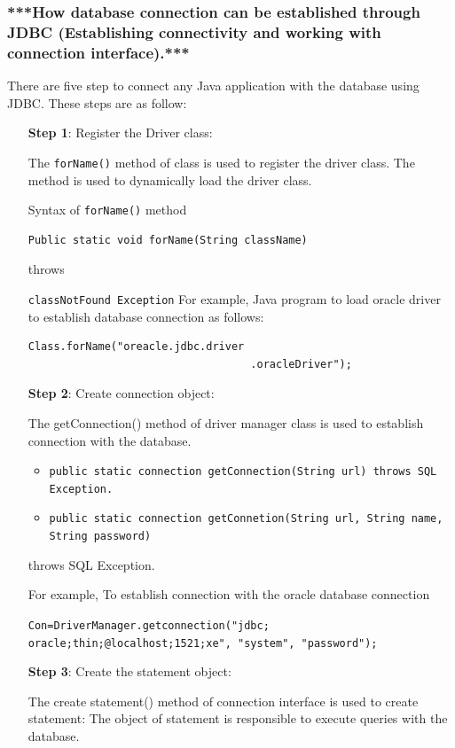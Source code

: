 \documentclass[twocolumn, a4paper]{article}
\begin{document}
\subsubsection{***How database connection can be established through JDBC
(Establishing connectivity and working with connection interface).***}
There are five step to connect any Java application with the database using
JDBC. These steps are as follow:
\begin{itemize}
  \item [\textbf{Step 1}:] Register the Driver class:

    The \verb+forName()+ method of class is used to register the driver class.
    The method is used to dynamically load the driver class.

    Syntax of \verb+forName()+ method
    \begin{lstlisting}
Public static void forName(String className)
    \end{lstlisting}
    throws

    \verb+classNotFound Exception+
    For example, Java program to load oracle driver to establish database
    connection as follows:

    \begin{lstlisting}
Class.forName("oreacle.jdbc.driver
                                   .oracleDriver");
    \end{lstlisting}
  \item [\textbf{Step 2}:] Create connection object:

    The getConnection() method of driver manager class is used to establish
    connection with the database.
    \begin{itemize}
      \item \texttt{public static connection getConnection(String url) throws SQL Exception.}
      \item \texttt{public static connection getConnetion(String url, String
        name, String password)}
    \end{itemize}
    throws SQL Exception.

    For example, To establish connection with the oracle database connection

    \texttt{Con=DriverManager.getconnection("jdbc; oracle;thin;@localhost;1521;xe", "system", "password");}
  \item [\textbf{Step 3}:] Create the statement object:

    The create statement() method of connection interface is used to create
    statement: The object of statement is responsible to execute queries with
    the database.


\end{itemize}
\end{document}
